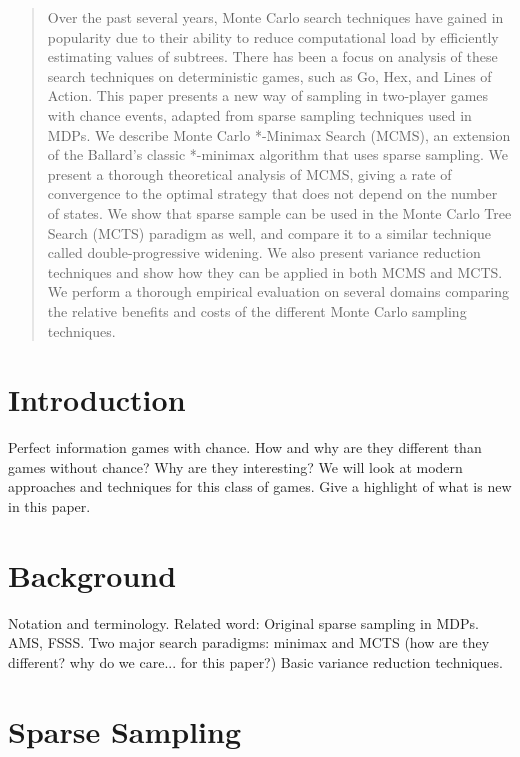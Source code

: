 \documentclass[jair,twoside,11pt,theapa]{article}
\begin{document}
\maketitle

\begin{abstract}
Over the past several years, Monte Carlo search techniques have gained in popularity 
due to their ability to reduce computational load by efficiently estimating values 
of subtrees.  
There has been a focus on analysis of these search techniques on deterministic
games, such as Go, Hex, and Lines of Action. 
This paper presents a new way of sampling in two-player games with chance events, 
adapted from sparse sampling techniques used in MDPs. 
We describe Monte Carlo *-Minimax Search (MCMS), an extension of the Ballard's 
classic *-minimax algorithm that uses sparse sampling. 
We present a thorough theoretical analysis of MCMS, giving a rate of convergence to the
optimal strategy that does not depend on the number of states. 
We show that sparse sample can be used in the Monte Carlo Tree Search (MCTS) paradigm as well, 
and compare it to a similar technique called double-progressive widening.
We also present variance reduction techniques and show how they can be applied in both 
MCMS and MCTS. 
We perform a thorough empirical evaluation on several domains comparing the relative benefits 
and costs of the different Monte Carlo sampling techniques. 
\end{abstract}

\section{Introduction}
\label{sec:intro}

Perfect information games with chance. 
How and why are they different than games without chance?
Why are they interesting?
We will look at modern approaches and techniques for this class of games.
Give a highlight of what is new in this paper.   

\section{Background}

Notation and terminology.
Related word: Original sparse sampling in MDPs. AMS, FSSS.
Two major search paradigms: minimax and MCTS (how are they different? why do we care... for this paper?)
Basic variance reduction techniques. 

\section{Sparse Sampling}
\end{document}
